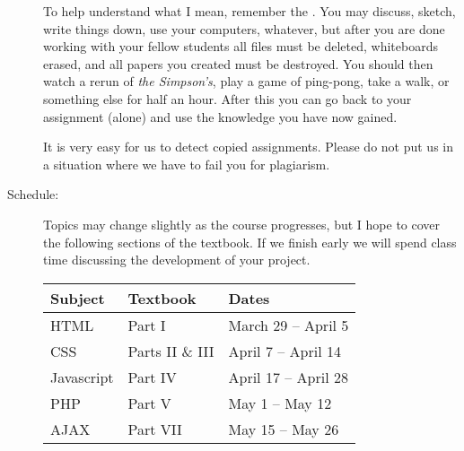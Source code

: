 \documentclass{article}
\begin{document}
\begin{description}
  To help understand what I mean, remember the {}.  You may discuss, sketch, write things down, use
  your computers, whatever, but after you are done working with your
  fellow students all files must be deleted, whiteboards erased, and
  all papers you created must be destroyed.  You should then watch a
  rerun of {\em the Simpson's}, play a game of ping-pong, take a walk,
  or something else for half an hour. After this you can go back to
  your assignment (alone) and use the knowledge you have now gained.

  It is very easy for us to detect copied assignments.  Please do not
  put us in a situation where we have to fail you for plagiarism.

\item[Schedule:] Topics may change slightly as the course progresses,
  but I hope to cover the following sections of the textbook.  If we
  finish early we will spend class time discussing the development of
  your project.
  
  \begin{tabular}{|l|l|l|}\hline
    Subject & Textbook & Dates \\\hline
HTML & Part I & March 29 -- April 5 \\\hline
 CSS & Parts II \& III & April 7 -- April 14 \\\hline
 Javascript & Part IV & April 17 -- April 28 \\\hline
 PHP & Part V & May 1 -- May 12 \\\hline
 AJAX & Part VII & May 15 -- May 26 \\\hline
\end{tabular}
\end{description}
\end{document}

